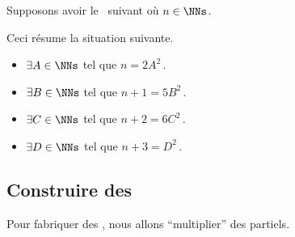 \begin{example}
	Supposons avoir le \sftab\ suivant où $n \in \NNs$.

	\begin{center}
	\end{center}

	Ceci résume la situation suivante.

	\vspace{-1ex}
	\begin{multicols}{2}
	\begin{itemize}
		\item $\exists A \in \NNs$ tel que $n     = 2 A^2$\,.

		\item $\exists B \in \NNs$ tel que $n + 1 = 5 B^2$\,.

		\item $\exists C \in \NNs$ tel que $n + 2 = 6 C^2$\,.

		\item $\exists D \in \NNs$ tel que $n + 3 =   D^2$\,.
	\end{itemize}
	\end{multicols}
\end{example}




\subsection{Construire des \sftab[x]}

\leavevmode

\smallskip
Pour fabriquer des \sftab[x], nous allons \enquote{multiplier} des \sftab[x] partiels.


